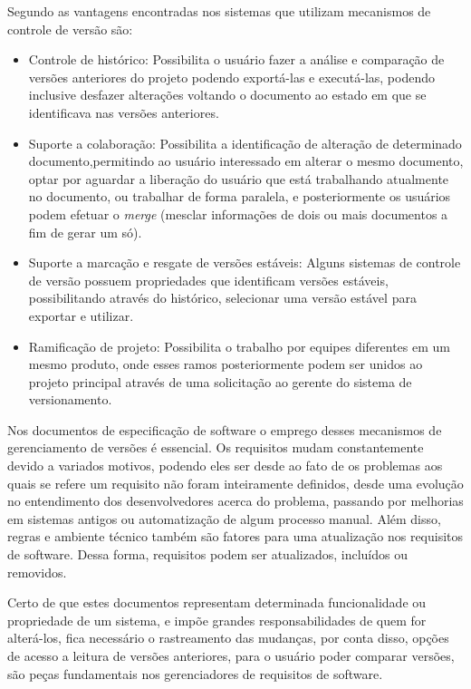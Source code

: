Segundo  as vantagens encontradas nos sistemas que utilizam mecanismos de controle de versão são: 
 \begin{itemize}
     \item Controle de histórico: Possibilita o usuário fazer a análise e comparação de versões anteriores do projeto podendo exportá-las e executá-las, podendo inclusive desfazer alterações voltando o documento ao estado em que se identificava nas versões anteriores.
     \item Suporte a colaboração: Possibilita a identificação de alteração de determinado documento,permitindo ao usuário interessado em alterar o mesmo documento, optar por aguardar a liberação do usuário que está trabalhando atualmente no documento, ou trabalhar de forma paralela, e posteriormente os usuários podem efetuar o \textit{merge} (mesclar informações de dois ou mais documentos a fim de gerar um só).
    \item Suporte a marcação e resgate de versões estáveis: Alguns sistemas de controle de versão possuem propriedades que identificam versões estáveis, possibilitando através do histórico, selecionar uma versão estável para exportar e utilizar.
    \item Ramificação de projeto: Possibilita o trabalho por equipes diferentes em um mesmo produto, onde esses ramos posteriormente podem ser unidos ao projeto principal através de uma solicitação ao gerente do sistema de versionamento.
 \end{itemize}

\newpage

Nos documentos de especificação de software o emprego desses
mecanismos de gerenciamento de versões é essencial. Os requisitos mudam
constantemente devido a variados motivos, podendo eles ser desde ao fato de os problemas aos quais se refere um requisito não foram inteiramente definidos, desde uma evolução no entendimento dos desenvolvedores acerca do problema, passando por melhorias em sistemas antigos ou automatização de algum processo manual. Além disso, regras e ambiente técnico também são fatores para uma atualização nos requisitos de software. Dessa forma, requisitos podem ser atualizados, incluídos ou removidos.

Certo de que estes documentos representam determinada funcionalidade ou
propriedade de um sistema, e impõe grandes responsabilidades de quem for alterá-los, fica necessário o rastreamento das mudanças, por conta disso, opções de acesso a leitura de versões anteriores, para o usuário poder comparar versões, são peças fundamentais nos gerenciadores de requisitos de software. 

